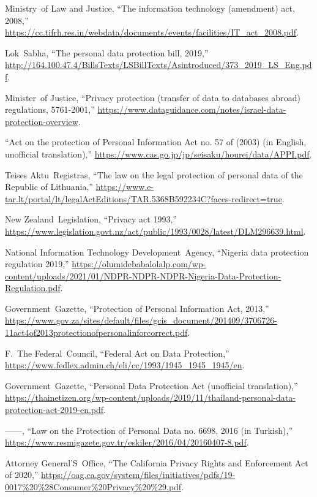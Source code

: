 \documentclass[journal]{IEEEtran}
\begin{document}
\begin{thebibliography}{100}
\relax Ministry~of Law and Justice, ``The information technology (amendment)
act, 2008,''
\url{https://cc.tifrh.res.in/webdata/documents/events/facilities/IT_act_2008.pdf}.

\relax Lok~Sabha, ``The personal data protection bill, 2019,''
\url{http://164.100.47.4/BillsTexts/LSBillTexts/Asintroduced/373_2019_LS_Eng.pdf}.

\relax Minister~of Justice, ``Privacy protection (transfer of data to databases
abroad) regulations, 5761-2001,''
\url{https://www.dataguidance.com/notes/israel-data-protection-overview}.

``Act on the protection of Personal Information Act no. 57 of (2003) (in
English, unofficial translation),''
\url{https://www.cas.go.jp/jp/seisaku/hourei/data/APPI.pdf}.

\relax Teises Aktu~Registras, ``The law on the legal protection of personal data of
the Republic of Lithuania,''
\url{https://www.e-tar.lt/portal/lt/legalActEditions/TAR.5368B592234C?faces-redirect=true}.

\relax New Zealand~Legislation, ``Privacy act 1993,''
\url{https://www.legislation.govt.nz/act/public/1993/0028/latest/DLM296639.html}.

\relax National Information Technology Development~Agency, ``Nigeria data
protection regulation 2019,''
\url{https://olumidebabalolalp.com/wp-content/uploads/2021/01/NDPR-NDPR-NDPR-Nigeria-Data-Protection-Regulation.pdf}.

\relax Government~Gazette, ``Protection of Personal Information Act, 2013,''
\url{https://www.gov.za/sites/default/files/gcis_document/201409/3706726-11act4of2013protectionofpersonalinforcorrect.pdf}.

F.~\relax The Federal~Council, ``Federal Act on Data Protection,''
\url{https://www.fedlex.admin.ch/eli/cc/1993/1945_1945_1945/en}.

\relax Government~Gazette, ``Personal Data Protection Act (unofficial
translation),''
\url{https://thainetizen.org/wp-content/uploads/2019/11/thailand-personal-data-protection-act-2019-en.pdf}.

------, ``Law on the Protection of Personal Data no. 6698, 2016 (in Turkish),''
\url{https://www.resmigazete.gov.tr/eskiler/2016/04/20160407-8.pdf}.

\relax Attorney General'S~Office, ``The California Privacy Rights and
Enforcement Act of 2020,''
\url{https://oag.ca.gov/system/files/initiatives/pdfs/19-0017\%20\%28Consumer\%20Privacy\%20\%29.pdf}.


\end{thebibliography}
\end{document}
